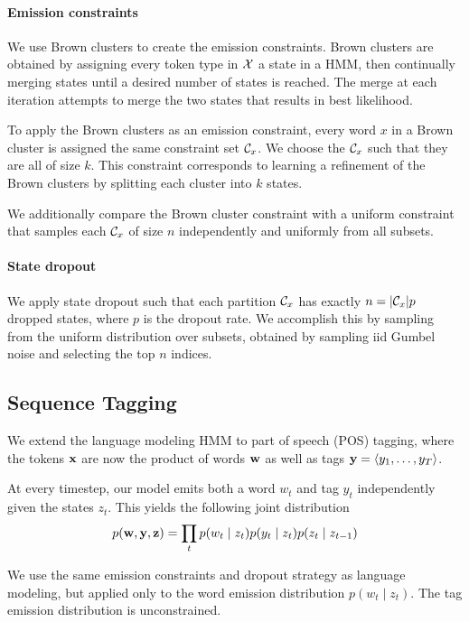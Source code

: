 \documentclass[11pt,a4paper]{article}
\begin{document}
\paragraph{Emission constraints}
We use Brown clusters \citep{brown1992} to create the emission constraints.
Brown clusters are obtained by assigning every token type in $\mathcal{X}$ a state in a HMM,
then continually merging states until a desired number of states is reached.
The merge at each iteration attempts to merge the two states that results in best likelihood.

To apply the Brown clusters as an emission constraint,
every word $x$ in a Brown cluster is assigned the same constraint set $\mathcal{C}_x$.
We choose the $\mathcal{C}_x$ such that they are all of size $k$.
This constraint corresponds to learning a refinement of the Brown clusters
by splitting each cluster into $k$ states.

We additionally compare the Brown cluster constraint with a uniform
constraint that samples each $\mathcal{C}_x$ of size $n$
independently and uniformly from all subsets.

\paragraph{State dropout}
We apply state dropout such that each partition $\mathcal{C}_x$ has exactly
$n = |\mathcal{C}_x|p$ dropped states, where $p$ is the dropout rate.
We accomplish this by sampling from the uniform distribution over subsets,
obtained by sampling iid Gumbel noise and selecting the top $n$ indices.

\subsection{Sequence Tagging}
We extend the language modeling HMM to part of speech (POS) tagging,
where the tokens $\mathbf{x}$ are now the product of words $\mathbf{w}$ as well as tags
$\mathbf{y} = \langle y_1, \ldots, y_T \rangle$.

At every timestep, our model emits both a word $w_t$ and tag $y_t$
independently given the states $z_t$.
This yields the following joint distribution
\begin{equation}
\begin{aligned}
p(\mathbf{w}, \mathbf{y}, \mathbf{z})
&= \prod_t p(w_t \mid z_t)p(y_t \mid z_t)p(z_t\mid z_{t-1})\\
\end{aligned}
\end{equation}

We use the same emission constraints and dropout strategy as language modeling,
but applied only to the word emission distribution $p(w_t \mid z_t)$.
The tag emission distribution is unconstrained.
\end{document}
